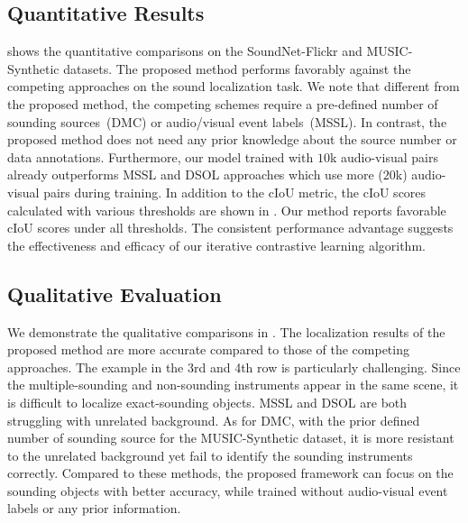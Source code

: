 \subsection{Quantitative Results}
\vspace{-3.2mm}
% 
 shows the quantitative comparisons on the SoundNet-Flickr and MUSIC-Synthetic datasets.
% 
The proposed method performs favorably against the competing approaches on the sound localization task.
%
We note that different from the proposed method, the competing schemes require a pre-defined number of sounding sources~(\ie DMC) or audio/visual event labels~(\ie MSSL).
%
In contrast, the proposed method does not need any prior knowledge about the source number or data annotations.
%
Furthermore, our model trained with $10$k audio-visual pairs already outperforms MSSL and DSOL approaches which use more (\ie $20$k) audio-visual pairs during training.
%
In addition to the cIoU metric, the cIoU scores calculated with various thresholds are shown in .
%
Our method reports favorable cIoU scores under all thresholds.
%
The consistent performance advantage suggests the effectiveness and efficacy of our iterative contrastive learning algorithm.






\vspace{-0.2mm}
\subsection{Qualitative Evaluation}
\vspace{\subsecmargin}
We demonstrate the qualitative comparisons in .
% 
The localization results of the proposed method are more accurate compared to those of the competing approaches.
% 
The example in the 3rd and 4th row is particularly challenging.
%
Since the multiple-sounding and non-sounding instruments appear in the same scene, it is difficult to localize exact-sounding objects.
MSSL and DSOL are both struggling with unrelated background. 
% 
As for DMC, with the prior defined number of sounding source for the MUSIC-Synthetic dataset, it is more resistant to the unrelated background yet fail to identify the sounding instruments correctly.
%
% 
Compared to these methods, the proposed framework can focus on the sounding objects with better accuracy, while trained without audio-visual event labels or any prior information.

